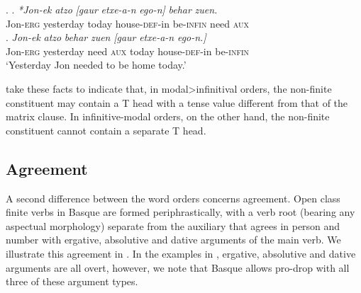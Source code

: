\documentclass[output=paper]{langscibook}
\begin{document}
\ex.	\ag.\textit{	*Jon-ek} \textit{atzo} \textit{[gaur}    \textit{etxe-a-n}     \textit{ego-n]}        \textit{behar} \textit{zuen.} \\
	Jon-\textsc{erg} yesterday today house-\textsc{def}-in be-\textsc{infin} need   \textsc{aux}    \\
\bg.	\textit{Jon-ek}    \textit{atzo}         \textit{behar}  \textit{zuen}  \textit{[gaur}   \textit{etxe-a-n }        \textit{ego-n.]} \\
	Jon-\textsc{erg} yesterday need   \textsc{aux}   today house-\textsc{def}-in be-\textsc{infin} \\
	`Yesterday Jon needed to be home today.' \\
\citep{etxepare-uribeetxebarria2009}

\cite{etxepare-uribeetxebarria2009, etxepare-uribeetxebarria2012} take these facts to indicate that, in modal>infinitival orders, the non-finite constituent may contain a T head with a tense value different from that of the matrix clause.  In infinitive-modal orders, on the other hand, the non-finite constituent cannot contain a separate T head.



\subsection{Agreement}

A second difference between the word orders concerns agreement.  Open class finite verbs in Basque are formed periphrastically, with a verb root (bearing any aspectual morphology) separate from the auxiliary that agrees in person and number with ergative, absolutive and dative arguments of the main verb.  We illustrate this agreement in \Next.\protect\footnotemark\protect{} In the examples in \Next, ergative, absolutive and dative arguments are all overt, however, we note that Basque allows pro-drop with all three of these argument types. 
 
\end{document}
